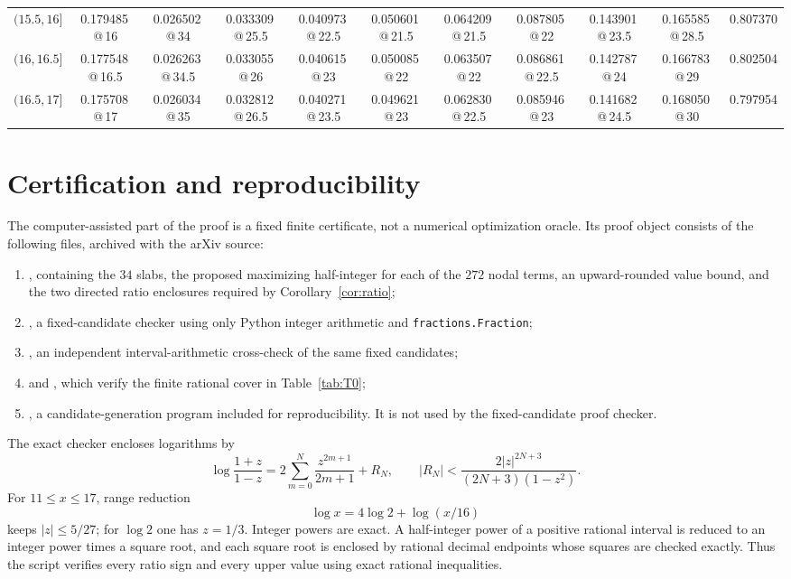 \documentclass[11pt]{amsart}
\theoremstyle{definition}
\begin{document}
\begin{landscape}
\begin{center}
\begin{tabular}{c|c|cccccccc|c}
$(15.5,16]$ & 0.179485\,@\,16 & 0.026502\,@\,34 & 0.033309\,@\,25.5 & 0.040973\,@\,22.5 & 0.050601\,@\,21.5 & 0.064209\,@\,21.5 & 0.087805\,@\,22 & 0.143901\,@\,23.5 & 0.165585\,@\,28.5 & 0.807370 \\
$(16,16.5]$ & 0.177548\,@\,16.5 & 0.026263\,@\,34.5 & 0.033055\,@\,26 & 0.040615\,@\,23 & 0.050085\,@\,22 & 0.063507\,@\,22 & 0.086861\,@\,22.5 & 0.142787\,@\,24 & 0.166783\,@\,29 & 0.802504 \\
$(16.5,17]$ & 0.175708\,@\,17 & 0.026034\,@\,35 & 0.032812\,@\,26.5 & 0.040271\,@\,23.5 & 0.049621\,@\,23 & 0.062830\,@\,22.5 & 0.085946\,@\,23 & 0.141682\,@\,24.5 & 0.168050\,@\,30 & 0.797954 \\
\bottomrule
\end{tabular}
\end{center}
\end{landscape}

\section{Certification and reproducibility}\label{app:arithmetic}

The computer-assisted part of the proof is a fixed finite certificate, not a numerical optimization oracle.  Its proof object consists of the following files, archived with the arXiv source:
\begin{enumerate}[label=(\roman*),leftmargin=2em]
\item {}, containing the $34$ slabs, the proposed maximizing half-integer for each of the $272$ nodal terms, an upward-rounded value bound, and the two directed ratio enclosures required by Corollary~\ref{cor:ratio};
\item {}, a fixed-candidate checker using only Python integer arithmetic and \texttt{fractions.Fraction};
\item {}, an independent interval-arithmetic cross-check of the same fixed candidates;
\item {} and , which verify the finite rational cover in Table~\ref{tab:T0};
\item {}, a candidate-generation program included for reproducibility.  It is not used by the fixed-candidate proof checker.
\end{enumerate}

The exact checker encloses logarithms by
\[
 \log\frac{1+z}{1-z}
 =2\sum_{m=0}^{N}\frac{z^{2m+1}}{2m+1}+R_N,
 \qquad
 |R_N|<\frac{2|z|^{2N+3}}{(2N+3)(1-z^2)}.
\]
For $11\le x\le17$, range reduction
\[
 \log x=4\log2+\log(x/16)
\]
keeps $|z|\le5/27$; for $\log2$ one has $z=1/3$.  Integer powers are exact.  A half-integer power of a positive rational interval is reduced to an integer power times a square root, and each square root is enclosed by rational decimal endpoints whose squares are checked exactly.  Thus the script verifies every ratio sign and every upper value using exact rational inequalities.
\end{document}
